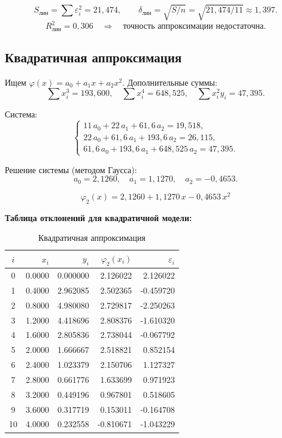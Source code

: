 \documentclass[a4paper,12pt]{article}
\begin{document}
\[
S_{\text{лин}} = \sum \varepsilon_i^2 = 21{,}474, \qquad
\delta_{\text{лин}} = \sqrt{S/n} = \sqrt{21{,}474/11} \approx 1{,}397.
\]
\[
R^2_{\text{лин}} = 0{,}306 \quad\Rightarrow\quad \text{точность аппроксимации недостаточна.}
\]

\subsection{Квадратичная аппроксимация}

Ищем $\varphi(x) = a_0 + a_1 x + a_2 x^2$. Дополнительные суммы:
\[
\sum x_i^3 = 193{,}600, \quad \sum x_i^4 = 648{,}525, \quad \sum x_i^2 y_i = 47{,}395.
\]

Система:
\[
\begin{cases}
11\,a_0 + 22\,a_1 + 61{,}6\,a_2 = 19{,}518, \\
22\,a_0 + 61{,}6\,a_1 + 193{,}6\,a_2 = 26{,}115, \\
61{,}6\,a_0 + 193{,}6\,a_1 + 648{,}525\,a_2 = 47{,}395.
\end{cases}
\]

Решение системы (методом Гаусса):
\[
a_0 = 2{,}1260, \quad a_1 = 1{,}1270, \quad a_2 = -0{,}4653.
\]

\[
\boxed{\varphi_2(x) = 2{,}1260 + 1{,}1270\,x - 0{,}4653\,x^2}
\]

\textbf{Таблица отклонений для квадратичной модели:}
\begin{table}[H]
\centering
\small
\begin{tabular}{|c|r|r|r|r|}
\hline
$i$ & $x_i$ & $y_i$ & $\varphi_2(x_i)$ & $\varepsilon_i$ \\
\hline
0  & 0.0000 & 0.000000  &  2.126022 &  2.126022 \\
1  & 0.4000 & 2.962085  &  2.502365 & -0.459720 \\
2  & 0.8000 & 4.980080  &  2.729817 & -2.250263 \\
3  & 1.2000 & 4.418696  &  2.808376 & -1.610320 \\
4  & 1.6000 & 2.805836  &  2.738044 & -0.067792 \\
5  & 2.0000 & 1.666667  &  2.518821 &  0.852154 \\
6  & 2.4000 & 1.023379  &  2.150706 &  1.127327 \\
7  & 2.8000 & 0.661776  &  1.633699 &  0.971923 \\
8  & 3.2000 & 0.449196  &  0.967801 &  0.518605 \\
9  & 3.6000 & 0.317719  &  0.153011 & -0.164708 \\
10 & 4.0000 & 0.232558  & -0.810671 & -1.043229 \\
\hline
\end{tabular}
\caption{Квадратичная аппроксимация}
\end{table}
\end{document}
